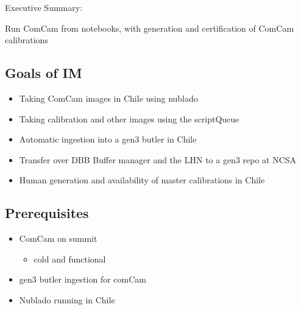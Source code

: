 
Executive Summary:

Run ComCam from notebooks, with generation and certification of ComCam calibrations

\subsection{Goals of IM}
\label{sec:orgbea7b56}
\begin{itemize}
\item Taking ComCam images in Chile using nublado
\item Taking calibration and other images using the \gls{scriptQueue}
\item Automatic ingestion into a gen3 butler in Chile
\item Transfer over \gls{DBB Buffer manager} and the \gls{LHN} to a gen3 repo at NCSA
\item Human generation and availability of master calibrations in Chile
\end{itemize}

\subsection{Prerequisites}
\begin{itemize}
\item{ComCam on summit}
\begin{itemize}
\item cold and functional
\end{itemize}
\item{gen3 butler ingestion for comCam}
\item{Nublado running in Chile}
\end{itemize}


